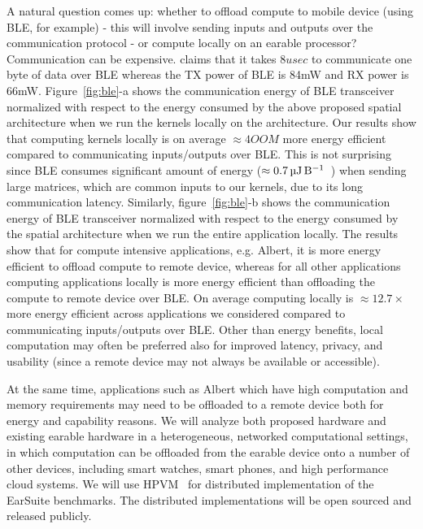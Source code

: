 A natural question comes up: whether to offload compute to 
mobile device (using BLE, for example) - this will involve sending inputs and outputs over the communication protocol - or compute locally on an earable processor? 
 Communication can be expensive. \cite{ble} claims that it takes $8usec$ to communicate one byte of data over BLE whereas the TX power of BLE is 84mW and RX power is 66mW. 
Figure~\ref{fig:ble}-a shows the 
communication energy of BLE transceiver normalized with respect to the energy consumed by the above proposed spatial architecture when we run the kernels locally on the architecture. Our results show that 
computing kernels locally is on average $\approx4OOM$ more energy efficient compared to communicating inputs/outputs over BLE. This is not surprising since BLE
consumes significant amount of energy ($\approx\SI{0.7}{\micro\joule\per\byte}$~\cite{ble}) when sending large matrices, which are common inputs to our kernels, due to its long communication latency.
Similarly, figure~\ref{fig:ble}-b shows the 
communication energy of BLE transceiver normalized with respect to the energy consumed by the spatial architecture when we run the entire application locally. The results show that 
for compute intensive applications, e.g. Albert, it is more energy efficient to offload compute to remote device,
whereas for all other applications 
computing applications locally is more energy efficient than offloading the compute to remote device over BLE.
On average computing locally  is $\approx12.7\times$ more energy efficient across applications we considered compared to communicating inputs/outputs over BLE. 
Other than energy benefits, local computation may often be preferred also for improved 
latency, privacy, and usability (since a remote device may not always be available or accessible).

At the same time, applications such as Albert which have high computation and memory requirements may need to be offloaded to a remote device both for energy and capability reasons. We will analyze both proposed hardware and existing earable hardware in a heterogeneous, networked computational settings, in which computation can be offloaded from the earable device onto a number of other devices, including smart watches,  smart phones, and high performance cloud systems. We will use HPVM~\cite{} for distributed implementation of the EarSuite benchmarks. The distributed implementations will be open sourced and released publicly. 
